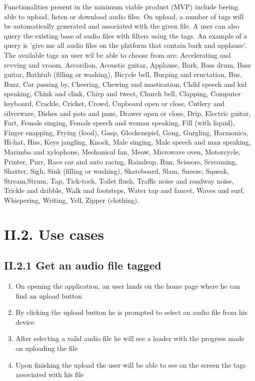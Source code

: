 \documentclass[11pt, a4papper]{report}
\theoremstyle{plain}
\theoremstyle{definition}
\theoremstyle{definition}
\theoremstyle{proposition}
\begin{document}
Functionalities present in the minimum viable product (MVP) include beeing able to upload, listen or download audio files. On upload, a number of tags will be automatically generated and associated with the given file. A user can also query the existing base of audio files with filters using the tags. An example of a query is 'give me all audio files on the platform that contain bark and applause'. The available tags an user wil be able to choose from are: Accelerating and revving and vroom, Accordion, Acoustic guitar, Applause, Bark, Bass drum, Bass guitar, Bathtub (filling or washing), Bicycle bell, Burping and eructation, Bus, Buzz, Car passing by, Cheering, Chewing and mastication, Child speech and kid speaking, Chink and clink, Chirp and tweet, Church bell, Clapping, Computer keyboard, Crackle, Cricket, Crowd, Cupboard open or close, Cutlery and silverware, Dishes and pots and pans, Drawer open or close, Drip, Electric guitar, Fart, Female singing, Female speech and woman speaking, Fill (with liquid), Finger snapping, Frying (food), Gasp, Glockenspiel, Gong, Gurgling, Harmonica, Hi-hat, Hiss, Keys jangling, Knock, Male singing, Male speech and man speaking, Marimba and xylophone, Mechanical fan, Meow, Microwave oven, Motorcycle, Printer, Purr, Race car and auto racing, Raindrop, Run, Scissors, Screaming, Shatter, Sigh, Sink (filling or washing), Skateboard, Slam, Sneeze, Squeak, Stream,Strum, Tap, Tick-tock, Toilet flush, Traffic noise and roadway noise, Trickle and dribble, Walk and footsteps, Water tap and faucet, Waves and surf, Whispering, Writing, Yell, Zipper (clothing).


\section*{II.2. Use cases}

\subsection*{II.2.1 Get an audio file tagged}

\begin{enumerate}
	\item{On opening the application, an user lands on the home page where he can find an upload button}
	\item{By clicking the upload button he is prompted to select an audio file from his device}
	\item{After selecting a valid audio file he will see a loader with the progress made on uploading the file}
	\item{Upon finishing the upload the user will be able to see on the screen the tags associated with his file}
\end{enumerate}
\end{document}
